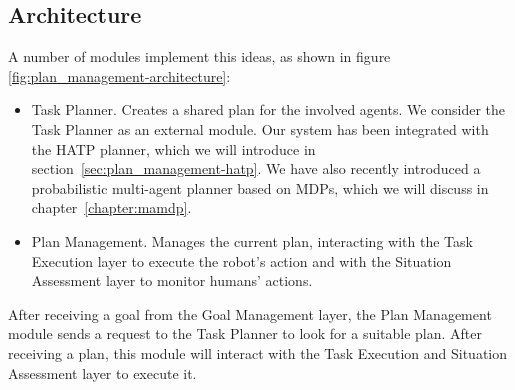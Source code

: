 
\subsection{Architecture}
A number of modules implement this ideas, as shown in figure \ref{fig:plan_management-architecture}:
\begin{itemize}
\item Task Planner. Creates a shared plan for the involved agents. We consider the Task Planner as an external module. Our system has been integrated with the HATP planner, which we will introduce in section~\ref{sec:plan_management-hatp}. We have also recently introduced a probabilistic multi-agent planner based on MDPs, which we will discuss in chapter~\ref{chapter:mamdp}.
\item Plan Management. Manages the current plan, interacting with the Task Execution layer to execute the robot's action and with the Situation Assessment layer to monitor humans' actions.
\end{itemize}

After receiving a goal from the Goal Management layer, the Plan Management module sends a request to the Task Planner to look for a suitable plan. After receiving a plan, this module will interact with the Task Execution and Situation Assessment layer to execute it. 

